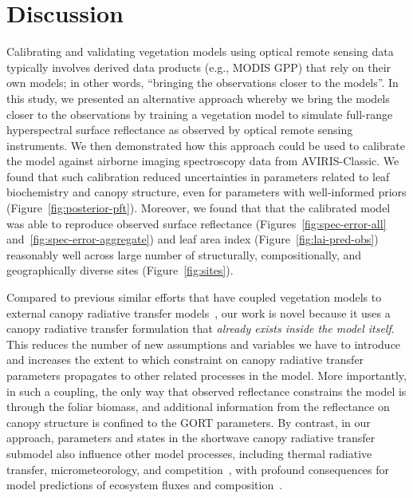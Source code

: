 \section{Discussion}

Calibrating and validating vegetation models using optical remote sensing data typically involves derived data products (e.g., MODIS GPP) that rely on their own models;
in other words, ``bringing the observations closer to the models''.
In this study, we presented an alternative approach whereby we bring the models closer to the observations by training a vegetation model to simulate full-range hyperspectral surface reflectance as observed by optical remote sensing instruments.
We then demonstrated how this approach could be used to calibrate the model against airborne imaging spectroscopy data from AVIRIS-Classic.
We found that such calibration reduced uncertainties in parameters related to leaf biochemistry and canopy structure, even for parameters with well-informed priors (Figure~\ref{fig:posterior-pft}).
Moreover, we found that that the calibrated model was able to reproduce observed surface reflectance (Figures~\ref{fig:spec-error-all} and~\ref{fig:spec-error-aggregate}) and leaf area index (Figure~\ref{fig:lai-pred-obs}) reasonably well across large number of structurally, compositionally, and geographically diverse sites (Figure~\ref{fig:sites}).

Compared to previous similar efforts that have coupled vegetation models to external canopy radiative transfer models~\citep{knorr2001assimilation, nouvellon2001coupling, quaife2008assimilating},
our work is novel because it uses a canopy radiative transfer formulation that \emph{already exists inside the model itself}.
This reduces the number of new assumptions and variables we have to introduce and increases the extent to which constraint on canopy radiative transfer parameters propagates to other related processes in the model.
More importantly, in such a coupling, the only way that observed reflectance constrains the model is through the foliar biomass, and additional information from the reflectance on canopy structure is confined to the GORT parameters.
By contrast, in our approach, parameters and states in the shortwave canopy radiative transfer submodel also influence other model processes, including thermal radiative transfer, micrometeorology, and competition~\citep{longo2019ed2description}, with profound consequences for model predictions of ecosystem fluxes and composition~\citep{viskari_2019_influence}.

